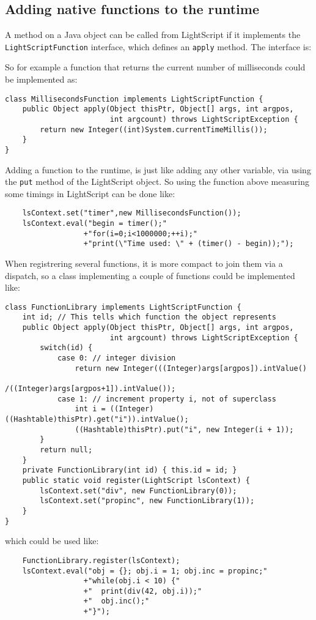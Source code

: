 \documentclass[11pt]{report}
\begin{document}
\subsection{Adding native functions to the runtime}

A method on a Java object can be called from LightScript if it implements the \verb|LightScriptFunction| interface, which defines an \verb|apply| method.
The interface is:

So for example a function that returns the current number of milliseconds could be implemented as:
\begin{lstlisting}
class MillisecondsFunction implements LightScriptFunction {
    public Object apply(Object thisPtr, Object[] args, int argpos, 
                        int argcount) throws LightScriptException {
        return new Integer((int)System.currentTimeMillis());
    }
}
\end{lstlisting}

Adding a function to the runtime, is just like adding any other variable,
via using the \verb|put| method of the LightScript object.
So using the function above measuring some timings in LightScript can be done like:
\begin{lstlisting}
    lsContext.set("timer",new MillisecondsFunction());
    lsContext.eval("begin = timer();"
                  +"for(i=0;i<1000000;++i);"
                  +"print(\"Time used: \" + (timer() - begin));");
\end{lstlisting}

When registrering several functions, it is more compact to join them via a dispatch, 
so a class implementing a couple of functions could be implemented like:
\begin{lstlisting}
class FunctionLibrary implements LightScriptFunction {
    int id; // This tells which function the object represents
    public Object apply(Object thisPtr, Object[] args, int argpos, 
                        int argcount) throws LightScriptException {
        switch(id) {
            case 0: // integer division
                return new Integer(((Integer)args[argpos]).intValue()
                                  /((Integer)args[argpos+1]).intValue());
            case 1: // increment property i, not of superclass
                int i = ((Integer)((Hashtable)thisPtr).get("i")).intValue();
                ((Hashtable)thisPtr).put("i", new Integer(i + 1));
        }
        return null;
    }
    private FunctionLibrary(int id) { this.id = id; }
    public static void register(LightScript lsContext) {
        lsContext.set("div", new FunctionLibrary(0));
        lsContext.set("propinc", new FunctionLibrary(1));
    }
}
\end{lstlisting}
which could be used like:
\begin{lstlisting}
    FunctionLibrary.register(lsContext);
    lsContext.eval("obj = {}; obj.i = 1; obj.inc = propinc;"
                  +"while(obj.i < 10) {"
                  +"  print(div(42, obj.i));"
                  +"  obj.inc();"
                  +"}");
\end{lstlisting}
\end{document}
